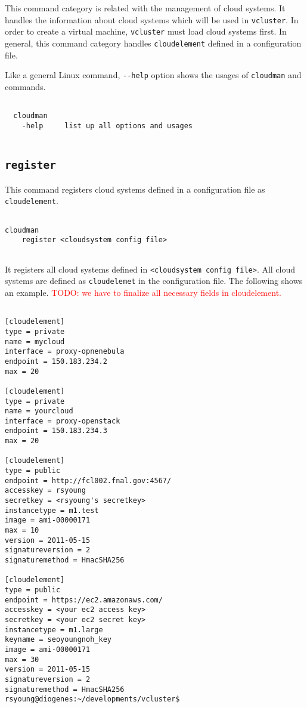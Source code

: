 \documentclass[11pt]{article}
\def \ttt{\texttt}
\def \vb{\verb}
\begin{document}
This command category is related with the management of cloud systems. It handles the information about cloud systems which will be used in \vb+vcluster+. In order to create a virtual machine, \vb+vcluster+ must load cloud systems first. In general, this command category handles \vb+cloudelement+ defined in a configuration file.

Like a general Linux command, \vb+--help+ option shows the usages of \vb+cloudman+ and commands.

\begin{Verbatim}[fontfamily=courier, fontsize = \small, obeytabs
=true, tabsize=4, frame=lines]

  cloudman 
    -help     list up all options and usages
  
\end{Verbatim}


\subsection{\ttt{register}}
This command registers cloud systems defined in a configuration file as \vb+cloudelement+. 

\begin{Verbatim}[fontfamily=courier, fontsize = \small, obeytabs
=true, tabsize=4, frame=lines]

cloudman 
    register <cloudsystem config file>
      
\end{Verbatim}

It registers all cloud systems defined in \vb+<cloudsystem config file>+. All cloud systems are defined as \vb+cloudelemet+ in the configuration file. The following shows an example. \textcolor{red}{TODO: we have to finalize all necessary fields in cloudelement.}

\begin{Verbatim}[fontfamily=courier, fontsize = \small, obeytabs
=true, tabsize=4, frame=lines]

[cloudelement]
type = private
name = mycloud
interface = proxy-opnenebula
endpoint = 150.183.234.2
max = 20

[cloudelement]
type = private
name = yourcloud
interface = proxy-openstack
endpoint = 150.183.234.3
max = 20

[cloudelement]
type = public
endpoint = http://fcl002.fnal.gov:4567/
accesskey = rsyoung
secretkey = <rsyoung's secretkey>
instancetype = m1.test
image = ami-00000171
max = 10
version = 2011-05-15
signatureversion = 2
signaturemethod = HmacSHA256

[cloudelement]
type = public
endpoint = https://ec2.amazonaws.com/
accesskey = <your ec2 access key>
secretkey = <your ec2 secret key>
instancetype = m1.large
keyname = seoyoungnoh_key 
image = ami-00000171
max = 30
version = 2011-05-15
signatureversion = 2
signaturemethod = HmacSHA256
rsyoung@diogenes:~/developments/vcluster$ 
      
\end{Verbatim}
\end{document}
